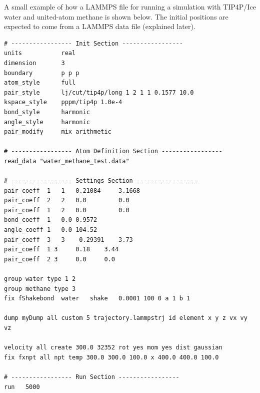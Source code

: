 A small example of how a LAMMPS file for running a simulation with TIP4P/Ice water and united-atom methane is shown below. The initial positions are expected to come from a LAMMPS data file (explained later).
\begin{lstlisting}[language=LammpsInput]
# ----------------- Init Section -----------------
units 			real
dimension 		3
boundary		p p p 
atom_style		full
pair_style		lj/cut/tip4p/long 1 2 1 1 0.1577 10.0
kspace_style	pppm/tip4p 1.0e-4
bond_style 		harmonic
angle_style		harmonic
pair_modify		mix arithmetic

# ----------------- Atom Definition Section -----------------
read_data "water_methane_test.data"

# ----------------- Settings Section -----------------
pair_coeff	1 	1 	0.21084 	3.1668
pair_coeff	2 	2	0.0 		0.0
pair_coeff	1 	2 	0.0 		0.0
bond_coeff  1 	0.0 0.9572
angle_coeff 1 	0.0 104.52
pair_coeff  3 	3 	 0.29391 	3.73
pair_coeff 	1 3 	0.18 	3.44
pair_coeff 	2 3 	0.0 	0.0

group water type 1 2
group methane type 3
fix	fShakebond	water 	shake 	0.0001 100 0 a 1 b 1

dump myDump all custom 5 trajectory.lammpstrj id element x y z vx vy vz

velocity all create 300.0 32352 rot yes mom yes dist gaussian
fix fxnpt all npt temp 300.0 300.0 100.0 x 400.0 400.0 100.0

# ----------------- Run Section -----------------
run   5000
\end{lstlisting}

